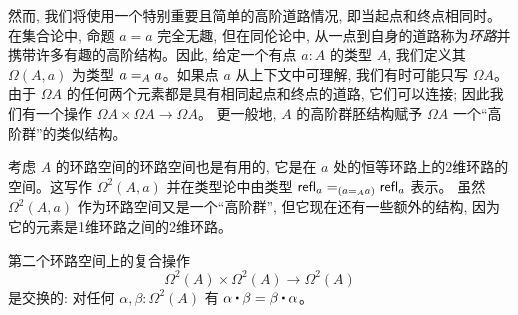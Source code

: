 然而, 我们将使用一个特别重要且简单的高阶道路情况, 即当起点和终点相同时。在集合论中, 命题 $a=a$ 完全无趣, 
但在同伦论中, 从一点到自身的道路称为\emph{环路}并携带许多有趣的高阶结构。因此, 给定一个有点 $a:A$ 的类型 $A$, 我们定义其
%
$\Omega(A,a)$ 为类型 $\id[A]{a}{a}$。如果点 $a$ 从上下文中可理解, 我们有时可能只写 $\Omega A$。
由于 $\Omega A$ 的任何两个元素都是具有相同起点和终点的道路, 它们可以连接; 因此我们有一个操作 $\Omega A\times \Omega A\to \Omega A$。
更一般地, $A$ 的高阶群胚结构赋予 $\Omega A$ 一个``高阶群''的类似结构。

考虑 $A$ 的环路空间的环路空间也是有用的, 
它是在 $a$ 处的恒等环路上的2维环路的空间。这写作 $\Omega^2(A,a)$ 并在类型论中由类型 $\id[({\id[A]{a}{a}})]{\refl{a}}{\refl{a}}$ 表示。
虽然 $\Omega^2(A,a)$ 作为环路空间又是一个``高阶群'', 但它现在还有一些额外的结构, 因为它的元素是1维环路之间的2维环路。

\begin{thm}\label{thm:EckmannHilton}
  第二个环路空间上的复合操作
  \begin{equation*}
    \Omega^2(A)\times \Omega^2(A)\to \Omega^2(A)
  \end{equation*}
  是交换的: 对任何 $\alpha, \beta:\Omega^2(A)$ 有 $\alpha\ct\beta = \beta\ct\alpha$。
\end{thm}

